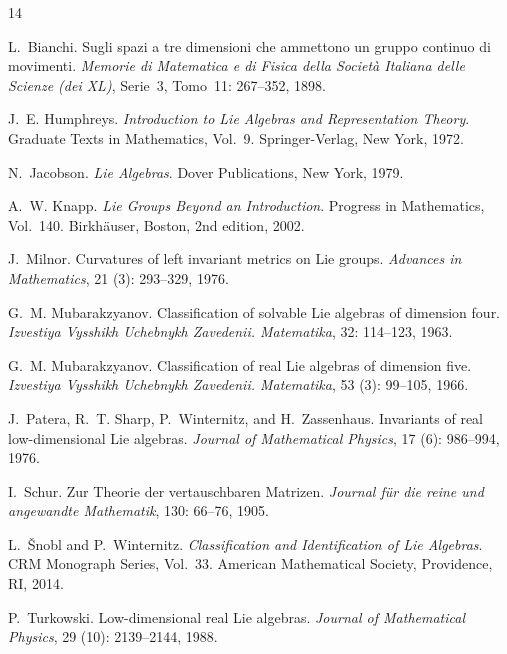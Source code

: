 \documentclass[11pt,a4paper]{article}
\theoremstyle{definition}
\theoremstyle{remark}
\begin{document}
\begin{thebibliography}{14}
\providecommand{\natexlab}[1]{#1}

L.~Bianchi.
\newblock Sugli spazi a tre dimensioni che ammettono un gruppo continuo di movimenti.
\newblock \emph{Memorie di Matematica e di Fisica della Societ\`a Italiana delle Scienze (dei XL)}, Serie~3, Tomo~11: 267--352, 1898.

J.~E. Humphreys.
\newblock \emph{Introduction to Lie Algebras and Representation Theory}.
\newblock Graduate Texts in Mathematics, Vol.~9. Springer-Verlag, New York, 1972.

N.~Jacobson.
\newblock \emph{Lie Algebras}.
\newblock Dover Publications, New York, 1979.

A.~W. Knapp.
\newblock \emph{Lie Groups Beyond an Introduction}.
\newblock Progress in Mathematics, Vol.~140. Birkh\"auser, Boston, 2nd edition, 2002.

J.~Milnor.
\newblock Curvatures of left invariant metrics on {L}ie groups.
\newblock \emph{Advances in Mathematics}, 21 (3): 293--329, 1976.

G.~M. Mubarakzyanov.
\newblock Classification of solvable {L}ie algebras of dimension four.
\newblock \emph{Izvestiya Vysshikh Uchebnykh Zavedenii. Matematika}, 32: 114--123, 1963.

G.~M. Mubarakzyanov.
\newblock Classification of real {L}ie algebras of dimension five.
\newblock \emph{Izvestiya Vysshikh Uchebnykh Zavedenii. Matematika}, 53 (3): 99--105, 1966.

J.~Patera, R.~T. Sharp, P.~Winternitz, and H.~Zassenhaus.
\newblock Invariants of real low-dimensional {L}ie algebras.
\newblock \emph{Journal of Mathematical Physics}, 17 (6): 986--994, 1976.

I.~Schur.
\newblock Zur {T}heorie der vertauschbaren {M}atrizen.
\newblock \emph{Journal f\"ur die reine und angewandte Mathematik}, 130: 66--76, 1905.

L.~\v{S}nobl and P.~Winternitz.
\newblock \emph{Classification and Identification of Lie Algebras}.
\newblock CRM Monograph Series, Vol.~33. American Mathematical Society, Providence, RI, 2014.

P.~Turkowski.
\newblock Low-dimensional real {L}ie algebras.
\newblock \emph{Journal of Mathematical Physics}, 29 (10): 2139--2144, 1988.

\end{thebibliography}
\end{document}
